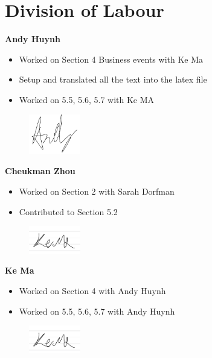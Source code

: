 \appendix
\section{Division of Labour}
\label{sec:division_of_labour}


\textbf{Andy Huynh}
\begin{itemize}
    \item Worked on Section 4 Business events with Ke Ma
    \item Setup and translated all the text into the latex file
    \item Worked on 5.5, 5.6, 5.7 with Ke MA
\end{itemize}
\begin{figure}[H]
	\includegraphics[width=0.2\textwidth]{Signatures/a.png}  
\end{figure}


\textbf{Cheukman Zhou}
\begin{itemize}
    \item Worked on Section 2 with Sarah Dorfman
    \item Contributed to Section 5.2
\end{itemize}
\begin{figure}[H]
	\includegraphics[width=0.2\textwidth]{Signatures/k.png}
\end{figure}


\textbf{Ke Ma}
\begin{itemize}
    \item Worked on Section 4 with Andy Huynh
    \item Worked on 5.5, 5.6, 5.7 with Andy Huynh
\end{itemize}
\begin{figure}[H]
	\includegraphics[width=0.2\textwidth]{Signatures/k.png}
\end{figure}


